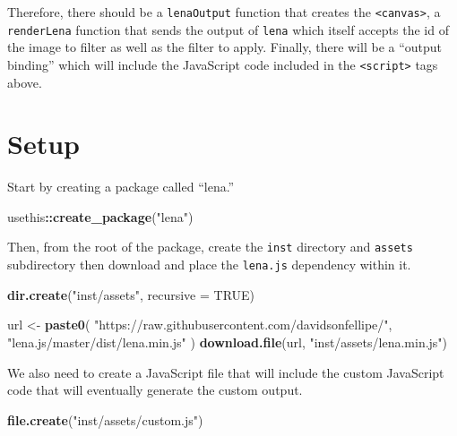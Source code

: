 \documentclass[
]{krantz}
\makeatletter
\newenvironment{Shaded}{\begin{snugshade}}{\end{snugshade}}
\newcommand{\DataTypeTok}[1]{\textcolor[rgb]{0.27,0.27,0.27}{#1}}
\newcommand{\KeywordTok}[1]{\textcolor[rgb]{0.27,0.27,0.27}{\textbf{#1}}}
\newcommand{\NormalTok}[1]{#1}
\newcommand{\OperatorTok}[1]{\textcolor[rgb]{0.43,0.43,0.43}{\textbf{#1}}}
\newcommand{\OtherTok}[1]{\textcolor[rgb]{0.37,0.37,0.37}{#1}}
\newcommand{\StringTok}[1]{\textcolor[rgb]{0.5,0.5,0.5}{#1}}
\newenvironment{kframe}{%
\medskip{}
\setlength{\fboxsep}{.8em}
 \def\at@end@of@kframe{}%
 \ifinner\ifhmode%
  \def\at@end@of@kframe{\end{minipage}}%
  \begin{minipage}{\columnwidth}%
 \fi\fi%
 \def\FrameCommand##1{\hskip\@totalleftmargin \hskip-\fboxsep
 \colorbox{shadecolor}{##1}\hskip-\fboxsep
     \hskip-\linewidth \hskip-\@totalleftmargin \hskip\columnwidth}%
 \MakeFramed {\advance\hsize-\width
   \@totalleftmargin\z@ \linewidth\hsize
   \@setminipage}}%
 {\par\unskip\endMakeFramed%
 \at@end@of@kframe}
\renewenvironment{Shaded}{\begin{kframe}}{\end{kframe}}
\makeatother
\begin{document}
Therefore, there should be a \texttt{lenaOutput} function that creates the \texttt{\textless{}canvas\textgreater{}}, a \texttt{renderLena} function that sends the output of \texttt{lena} which itself accepts the id of the image to filter as well as the filter to apply. Finally, there will be a ``output binding'' which will include the JavaScript code included in the \texttt{\textless{}script\textgreater{}} tags above.

\hypertarget{setup}{%
\section{Setup}\label{setup}}

Start by creating a package called ``lena.''

\begin{Shaded}
\begin{Highlighting}[]
\NormalTok{usethis}\OperatorTok{::}\KeywordTok{create\_package}\NormalTok{(}\StringTok{"lena"}\NormalTok{)}
\end{Highlighting}
\end{Shaded}

Then, from the root of the package, create the \texttt{inst} directory and \texttt{assets} subdirectory then download and place the \texttt{lena.js} dependency within it.

\begin{Shaded}
\begin{Highlighting}[]
\KeywordTok{dir.create}\NormalTok{(}\StringTok{"inst/assets"}\NormalTok{, }\DataTypeTok{recursive =} \OtherTok{TRUE}\NormalTok{)}

\NormalTok{url <{-}}\StringTok{ }\KeywordTok{paste0}\NormalTok{(}
  \StringTok{"https://raw.githubusercontent.com/davidsonfellipe/"}\NormalTok{,}
  \StringTok{"lena.js/master/dist/lena.min.js"}
\NormalTok{)}
\KeywordTok{download.file}\NormalTok{(url, }\StringTok{"inst/assets/lena.min.js"}\NormalTok{)}
\end{Highlighting}
\end{Shaded}

We also need to create a JavaScript file that will include the custom JavaScript code that will eventually generate the custom output.

\begin{Shaded}
\begin{Highlighting}[]
\KeywordTok{file.create}\NormalTok{(}\StringTok{"inst/assets/custom.js"}\NormalTok{)}
\end{Highlighting}
\end{Shaded}
\end{document}
